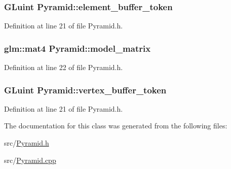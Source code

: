 \subsubsection[{element\+\_\+buffer\+\_\+token}]{\setlength{\rightskip}{0pt plus 5cm}G\+Luint Pyramid\+::element\+\_\+buffer\+\_\+token\hspace{0.3cm}{\ttfamily [private]}}\label{class_pyramid_a760ec3c4f40ea025e57f0f95d118a921}


Definition at line 21 of file Pyramid.\+h.

\hypertarget{class_pyramid_a6c97c4bb0dd7e4f12e50edd8dcc1cce9}{}
\subsubsection[{model\+\_\+matrix}]{\setlength{\rightskip}{0pt plus 5cm}glm\+::mat4 Pyramid\+::model\+\_\+matrix\hspace{0.3cm}{\ttfamily [private]}}\label{class_pyramid_a6c97c4bb0dd7e4f12e50edd8dcc1cce9}


Definition at line 22 of file Pyramid.\+h.

\hypertarget{class_pyramid_a8e1f08dc7c85cabe71117b1c9b8ea987}{}
\subsubsection[{vertex\+\_\+buffer\+\_\+token}]{\setlength{\rightskip}{0pt plus 5cm}G\+Luint Pyramid\+::vertex\+\_\+buffer\+\_\+token\hspace{0.3cm}{\ttfamily [private]}}\label{class_pyramid_a8e1f08dc7c85cabe71117b1c9b8ea987}


Definition at line 21 of file Pyramid.\+h.



The documentation for this class was generated from the following files\+:\begin{DoxyCompactItemize}
\item 
src/\hyperlink{_pyramid_8h}{Pyramid.\+h}\item 
src/\hyperlink{_pyramid_8cpp}{Pyramid.\+cpp}\end{DoxyCompactItemize}
